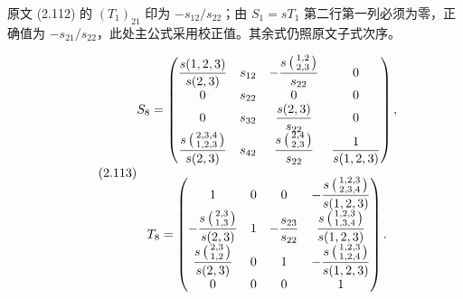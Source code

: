 \begin{note}
原文 (2.112) 的 $(T_1)_{21}$ 印为 $-s_{12}/s_{22}$；由 $S_1=sT_1$ 第二行第一列必须为零，正确值为 $-s_{21}/s_{22}$，此处主公式采用校正值。其余式仍照原文子式次序。
\end{note}
\begin{equation}\originaleq{2.113}
\begin{gathered}
S_8=\begin{pmatrix}
\dfrac{s(1,2,3)}{s(2,3)}&s_{12}&-\dfrac{s\left(\begin{smallmatrix}1,2\\2,3\end{smallmatrix}\right)}{s_{22}}&0\\
0&s_{22}&0&0\\
0&s_{32}&\dfrac{s(2,3)}{s_{22}}&0\\
\dfrac{s\left(\begin{smallmatrix}2,3,4\\1,2,3\end{smallmatrix}\right)}{s(2,3)}&s_{42}&\dfrac{s\left(\begin{smallmatrix}2,4\\2,3\end{smallmatrix}\right)}{s_{22}}&\dfrac{1}{s(1,2,3)}
\end{pmatrix},\\[5pt]
T_8=\begin{pmatrix}
1&0&0&-\dfrac{s\left(\begin{smallmatrix}1,2,3\\2,3,4\end{smallmatrix}\right)}{s(1,2,3)}\\
-\dfrac{s\left(\begin{smallmatrix}2,3\\1,3\end{smallmatrix}\right)}{s(2,3)}&1&-\dfrac{s_{23}}{s_{22}}&\dfrac{s\left(\begin{smallmatrix}1,2,3\\1,3,4\end{smallmatrix}\right)}{s(1,2,3)}\\
\dfrac{s\left(\begin{smallmatrix}2,3\\1,2\end{smallmatrix}\right)}{s(2,3)}&0&1&-\dfrac{s\left(\begin{smallmatrix}1,2,3\\1,2,4\end{smallmatrix}\right)}{s(1,2,3)}\\
0&0&0&1
\end{pmatrix}.
\end{gathered}
\end{equation}
